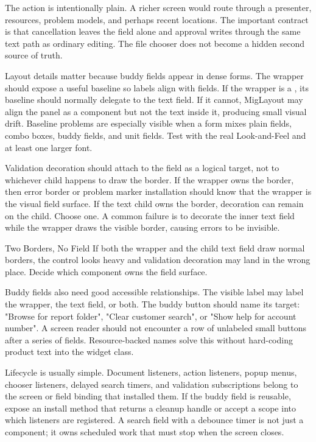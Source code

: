 The action is intentionally plain. A richer screen would route through a presenter,
resources, problem models, and perhaps recent locations. The important contract is that
cancellation leaves the field alone and approval writes through the same text path as
ordinary editing. The file chooser does not become a hidden second source of truth.

Layout details matter because buddy fields appear in dense forms. The wrapper should
expose a useful baseline so labels align with fields. If the wrapper is a ,
its baseline should normally delegate to the text field. If it cannot, MigLayout may
align the panel as a component but not the text inside it, producing small visual drift.
Baseline problems are especially visible when a form mixes plain fields, combo boxes,
buddy fields, and unit fields. Test with the real Look-and-Feel and at least one larger
font.

Validation decoration should attach to the field as a logical target, not to whichever
child happens to draw the border. If the wrapper owns the border, then error border or
problem marker installation should know that the wrapper is the visual field surface. If
the text child owns the border, decoration can remain on the child. Choose one. A common
failure is to decorate the inner text field while the wrapper draws the visible border,
causing errors to be invisible.

\begin{pitfallbox}{Two Borders, No Field}
If both the wrapper and the child text field draw normal borders, the control looks
heavy and validation decoration may land in the wrong place. Decide which component owns
the field surface.
\end{pitfallbox}

Buddy fields also need good accessible relationships. The visible label may label the
wrapper, the text field, or both. The buddy button should name its target: "Browse for
report folder", "Clear customer search", or "Show help for account number". A screen
reader should not encounter a row of unlabeled small buttons after a series of fields.
Resource-backed names solve this without hard-coding product text into the widget class.

Lifecycle is usually simple. Document listeners, action listeners, popup menus, chooser
listeners, delayed search timers, and validation subscriptions belong to the screen or
field binding that installed them. If the buddy field is reusable, expose an install
method that returns a cleanup handle or accept a scope into which listeners are
registered. A search field with a debounce timer is not just a component; it owns
scheduled work that must stop when the screen closes.

